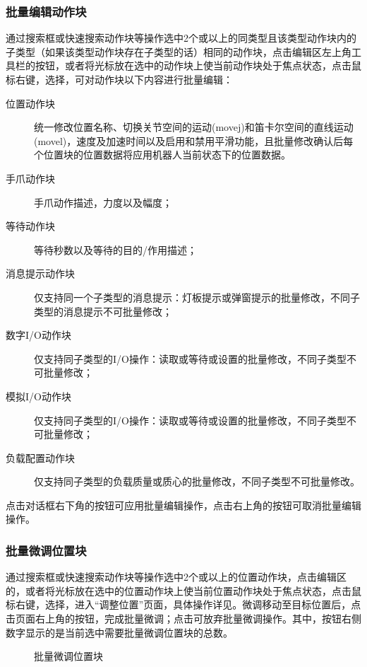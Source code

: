 \subsubsection{批量编辑动作块}
通过搜索框或快速搜索动作块等操作选中2个或以上的同类型且该类型动作块内的子类型（如果该类型动作块存在子类型的话）相同的动作块，点击编辑区左上角工具栏的按钮，或者将光标放在选中的动作块上使当前动作块处于焦点状态，点击鼠标右键，选择，可对动作块以下内容进行批量编辑：
\begin{description}
\item [位置动作块] 统一修改位置名称、切换关节空间的运动(movej)和笛卡尔空间的直线运动(movel)，速度及加速时间以及启用和禁用平滑功能，且批量修改确认后每个位置块的位置数据将应用机器人当前状态下的位置数据。
\item [手爪动作块] 手爪动作描述，力度以及幅度；
\item [等待动作块] 等待秒数以及等待的目的/作用描述；
\item [消息提示动作块] 仅支持同一个子类型的消息提示：灯板提示或弹窗提示的批量修改，不同子类型的消息提示不可批量修改；
\item [数字I/O动作块] 仅支持同子类型的I/O操作：读取或等待或设置的批量修改，不同子类型不可批量修改；
\item [模拟I/O动作块] 仅支持同子类型的I/O操作：读取或等待或设置的批量修改，不同子类型不可批量修改；
\item [负载配置动作块] 仅支持同子类型的负载质量或质心的批量修改，不同子类型不可批量修改。
\end{description}

点击对话框右下角的按钮可应用批量编辑操作，点击右上角的\kbd{$\times$}按钮可取消批量编辑操作。


\subsubsection{批量微调位置块}
通过搜索框或快速搜索动作块等操作选中2个或以上的位置动作块，点击编辑区的，或者将光标放在选中的位置动作块上使当前位置动作块处于焦点状态，点击鼠标右键，选择，进入“调整位置”页面，具体操作详见。微调移动至目标位置后，点击页面右上角的按钮，完成批量微调；点击可放弃批量微调操作。其中，按钮右侧数字显示的是当前选中需要批量微调位置块的总数。

\begin{figure}[ht]
	\centering
	\color{red}{缺图}
	\caption{批量微调位置块}
	\label{fig:批量微调位置块}
\end{figure}

